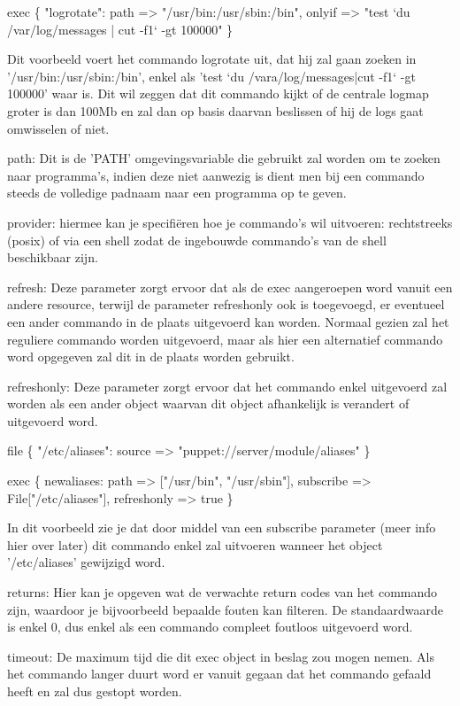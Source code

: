 			exec \{ "logrotate":
				path => "/usr/bin:/usr/sbin:/bin",
				onlyif => "test `du /var/log/messages | cut -f1` -gt 100000"
			\}

		Dit voorbeeld voert het commando logrotate uit, dat hij zal gaan zoeken in '/usr/bin:/usr/sbin:/bin', enkel als 'test `du /vara/log/messages|cut -f1` -gt 100000' waar is.
		Dit wil zeggen dat dit commando kijkt of de centrale logmap groter is dan 100Mb en zal dan op basis daarvan beslissen of hij de logs gaat omwisselen of niet.

		path:
		Dit is de 'PATH' omgevingsvariable die gebruikt zal worden om te zoeken naar programma's, indien deze niet aanwezig is dient men bij een commando steeds de volledige padnaam naar een programma op te geven.

		provider:
		hiermee kan je specifi\"{e}ren hoe je commando's wil uitvoeren: rechtstreeks (posix) of via een shell zodat de ingebouwde commando's van de shell beschikbaar zijn.

		refresh:
		Deze parameter zorgt ervoor dat als de exec aangeroepen word vanuit een andere resource, terwijl de parameter refreshonly ook is toegevoegd, er eventueel een ander commando in de plaats uitgevoerd kan worden.
		Normaal gezien zal het reguliere commando worden uitgevoerd, maar als hier een alternatief commando word opgegeven zal dit in de plaats worden gebruikt.

		refreshonly:
		Deze parameter zorgt ervoor dat het commando enkel uitgevoerd zal worden als een ander object waarvan dit object afhankelijk is verandert of uitgevoerd word.

			file \{ "/etc/aliases":
				source => "puppet://server/module/aliases"
			\}

			exec \{ newaliases:
				path => ["/usr/bin", "/usr/sbin"],
				subscribe => File["/etc/aliases"],
				refreshonly => true
			\}

		In dit voorbeeld zie je dat door middel van een subscribe parameter (meer info hier over later) dit commando enkel zal uitvoeren wanneer het object '/etc/aliases' gewijzigd word.

		returns:
		Hier kan je opgeven wat de verwachte return codes van het commando zijn, waardoor je bijvoorbeeld bepaalde fouten kan filteren.
		De standaardwaarde is enkel 0, dus enkel als een commando compleet foutloos uitgevoerd word.

		timeout:
		De maximum tijd die dit exec object in beslag zou mogen nemen.
		Als het commando langer duurt word er vanuit gegaan dat het commando gefaald heeft en zal dus gestopt worden.

